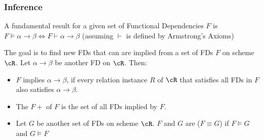 \subsubsection{Inference}
A fundamental result for a given set of Functional Dependencies $F$ is $F \models \alpha \rightarrow \beta \Leftrightarrow F \vdash \alpha \rightarrow \beta$
(assuming $\vdash$ is defined by Armstrong's Axioms)

The goal is to find new FDs that can are implied from a set of FDs $F$ on scheme $\cR$. Let $\alpha \rightarrow \beta$ be another FD on $\cR$. Then:
\begin{itemize}
    \item $F$ implies $\alpha \rightarrow \beta$, if every relation instance $R$ of $\cR$ that satisfies all FDs in $F$ also satisfies $\alpha \rightarrow \beta$.
    \item The  $F+$ of $F$ is the set of all FDs implied by $F$.
    \item Let $G$ be another set of FDs on scheme $\cR$. $F$ and $G$ are  ($F \equiv G$) if $F \models G$ and $G \models F$
\end{itemize}
